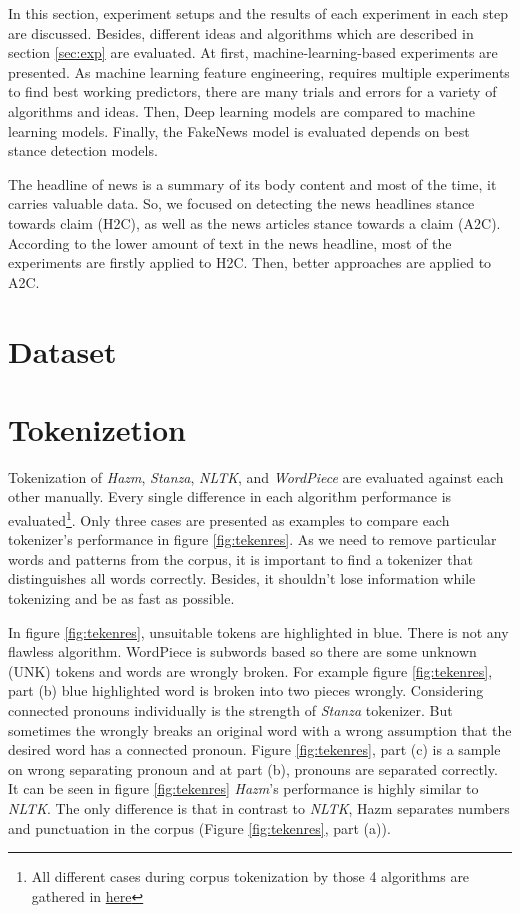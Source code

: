 In this section, experiment setups and the results of each experiment in each step are discussed. Besides, different ideas and algorithms which are described in section \ref{sec:exp} are evaluated. At first, machine-learning-based experiments are presented. As machine learning feature engineering, requires multiple experiments to find best working predictors, there are many trials and errors for a variety of algorithms and ideas. Then, Deep learning models are compared to machine learning models. Finally, the FakeNews model is evaluated depends on best stance detection models.

The headline of news is a summary of its body content and most of the time, it carries valuable data. So, we focused on detecting the news headlines stance towards claim (\ac{H2C}), as well as the news articles stance towards a claim (\ac{A2C}). According to the lower amount of text in the news headline, most of the experiments are firstly applied to H2C. Then, better approaches are applied to \ac{A2C}.  


\section{Dataset}
\label{sec:dataset}



\section{Tokenizetion}
Tokenization of \textit{Hazm}, \textit{Stanza}, \textit{\ac{NLTK}}, and \textit{WordPiece} are evaluated against each other manually. Every single difference in each algorithm performance is evaluated\footnote{All different cases during corpus tokenization by those 4 algorithms are gathered in \href{https://docs.google.com/document/d/1SlRBnoyLntLJ5yalWXZ1EqJ0wRj4DyiEMJdewkEkrTM/edit?usp=sharing}{here}}. Only three cases are presented as examples to compare each tokenizer's performance in figure \ref{fig:tekenres}. As we need to remove particular words and patterns from the corpus,  it is important to find a tokenizer that distinguishes all words correctly. Besides, it shouldn't lose information while tokenizing and be as fast as possible. 

In figure \ref{fig:tekenres}, unsuitable tokens are highlighted in blue. There is not any flawless algorithm. WordPiece is subwords based so there are some unknown (\ac{UNK}) tokens and words are wrongly broken. For example figure \ref{fig:tekenres}, part (b) blue highlighted word is broken into two pieces wrongly. Considering connected pronouns individually is the strength of \textit{Stanza} tokenizer. But sometimes the  wrongly breaks an original word with a wrong assumption that the desired word has a connected pronoun. Figure \ref{fig:tekenres}, part (c) is a sample on wrong separating pronoun and at part (b), pronouns are separated correctly. It can be seen in figure \ref{fig:tekenres} \textit{Hazm}'s performance is highly similar to \textit{NLTK}. The only difference is that in contrast to \textit{\ac{NLTK}}, Hazm separates numbers and punctuation in the corpus (Figure \ref{fig:tekenres}, part (a)). 

